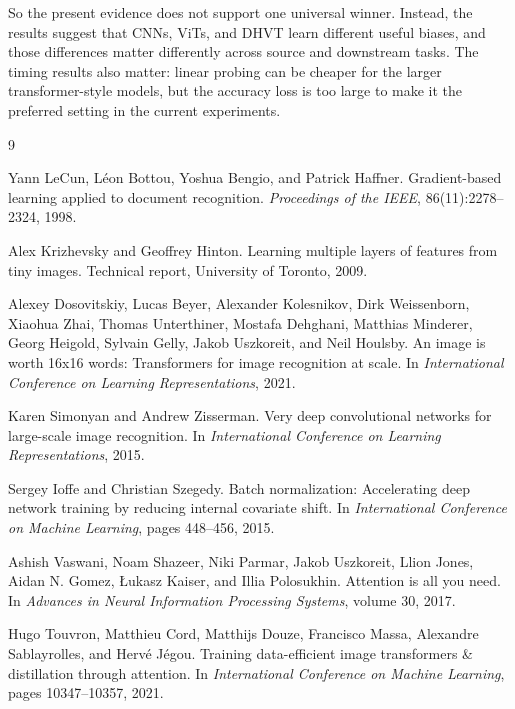 \documentclass[11pt]{article}
\begin{document}
So the present evidence does not support one universal winner. Instead, the results suggest that CNNs, ViTs, and DHVT learn different useful biases, and those differences matter differently across source and downstream tasks. The timing results also matter: linear probing can be cheaper for the larger transformer-style models, but the accuracy loss is too large to make it the preferred setting in the current experiments.

\begin{thebibliography}{9}

Yann LeCun, Léon Bottou, Yoshua Bengio, and Patrick Haffner.
\newblock Gradient-based learning applied to document recognition.
\newblock \emph{Proceedings of the IEEE}, 86(11):2278--2324, 1998.

Alex Krizhevsky and Geoffrey Hinton.
\newblock Learning multiple layers of features from tiny images.
\newblock Technical report, University of Toronto, 2009.

Alexey Dosovitskiy, Lucas Beyer, Alexander Kolesnikov, Dirk Weissenborn, Xiaohua Zhai, Thomas Unterthiner, Mostafa Dehghani, Matthias Minderer, Georg Heigold, Sylvain Gelly, Jakob Uszkoreit, and Neil Houlsby.
\newblock An image is worth 16x16 words: Transformers for image recognition at scale.
\newblock In \emph{International Conference on Learning Representations}, 2021.

Karen Simonyan and Andrew Zisserman.
\newblock Very deep convolutional networks for large-scale image recognition.
\newblock In \emph{International Conference on Learning Representations}, 2015.

Sergey Ioffe and Christian Szegedy.
\newblock Batch normalization: Accelerating deep network training by reducing internal covariate shift.
\newblock In \emph{International Conference on Machine Learning}, pages 448--456, 2015.

Ashish Vaswani, Noam Shazeer, Niki Parmar, Jakob Uszkoreit, Llion Jones, Aidan N. Gomez, {\L}ukasz Kaiser, and Illia Polosukhin.
\newblock Attention is all you need.
\newblock In \emph{Advances in Neural Information Processing Systems}, volume 30, 2017.

Hugo Touvron, Matthieu Cord, Matthijs Douze, Francisco Massa, Alexandre Sablayrolles, and Hervé Jégou.
\newblock Training data-efficient image transformers \& distillation through attention.
\newblock In \emph{International Conference on Machine Learning}, pages 10347--10357, 2021.


\end{thebibliography}
\end{document}
